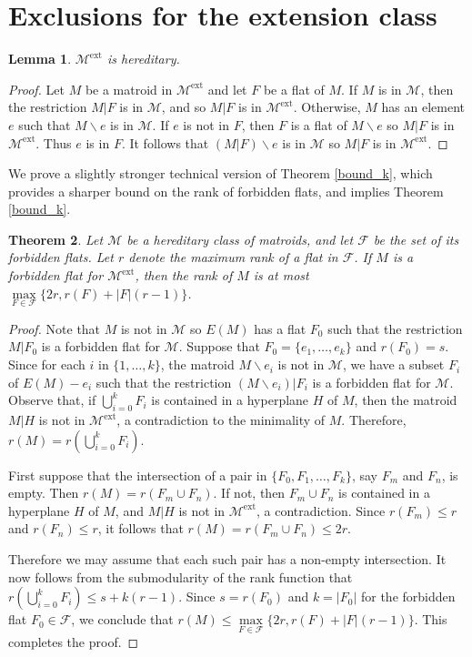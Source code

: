 \documentclass[11pt]{amsart}
\newtheorem{theorem}{Theorem}[section]
\newtheorem{lemma}[theorem]{Lemma}
\theoremstyle{definition}
\theoremstyle{remark}
\numberwithin{equation}{section}
\newcommand\Me{\mathcal{M}^\mathrm{ext}}
\newcommand\ba{\backslash}
\begin{document}
\section{Exclusions for the extension class}



\begin{lemma}
\label{hereditary}
$\Me$ is hereditary.
\end{lemma}
\begin{proof}
Let $M$ be a matroid in $\Me$ and let $F$ be a flat of $M$. If $M$ is in $\mathcal{M}$, then the restriction $M|F$ is in $\mathcal{M}$, and so $M|F$ is in $\Me$. Otherwise, $M$ has an element $e$ such that $M \ba e$ is in $\mathcal{M}$. If $e$ is not in $F$, then $F$ is a flat of $M \ba e$ so  $M|F$ is in $\Me$. Thus $e$ is in $F$.  It follows that $(M|F)\ba e$ is in $\mathcal{M}$ so $M|F$ is in $\Me$.
\end{proof}


We prove a slightly stronger technical version of Theorem \ref{bound_k}, which provides a sharper bound on the rank of forbidden flats, and implies Theorem \ref{bound_k}. 

\begin{theorem}
\label{bound_k_general}
Let $\mathcal{M}$ be a hereditary class of matroids, and let $\mathcal{F}$ be the set of its forbidden flats. Let $r$ denote the maximum rank of a flat in $\mathcal{F}$. If $M$ is a forbidden flat for $\Me$, then the rank of $M$ is at most $\max\limits_{F \in \mathcal{F}}{\{2r, r(F) + |F|(r-1)\}}$. 
\end{theorem}


\begin{proof}
Note that $M$ is not in $\mathcal{M}$ so $E(M)$ has a flat $F_0$ such that the restriction $M|F_0$ is a forbidden flat for $\mathcal{M}$. Suppose that $F_0 = \{e_1, \ldots, e_k\}$ and $r(F_0) = s$. Since for each $i$ in $\{1, \ldots, k\}$, the matroid $M \ba e_i$ is not in $\mathcal{M}$, we have a subset $F_i$ of $E(M)-e_i$ such that the restriction $(M \ba e_i)|F_i$ is a forbidden flat for $\mathcal{M}$. Observe that, if $\bigcup_{i=0}^{k} F_i$ is contained in a hyperplane $H$ of $M$, then the matroid $M|H$ is not in $\Me$, a contradiction to the minimality of $M$. Therefore, $r(M) = r(\bigcup_{i=0}^{k} F_i)$.

First suppose that the intersection of a pair in $\{F_0, F_1, \ldots, F_k\}$, say $F_m$ and $F_n$, is empty. Then $r(M)=r(F_m \cup F_n)$. If not, then $F_m \cup F_n$ is contained in a hyperplane $H$ of $M$, and $M|H$ is not in $\Me$, a contradiction. Since $r(F_m) \leq r$ and $r(F_n) \leq r$, it follows that $r(M) = r(F_m\cup F_n) \leq 2r$. 

Therefore we may assume that each such pair has a non-empty intersection. It now follows from the submodularity of the rank function that $r(\bigcup_{i=0}^{k} F_i) \leq s + k(r-1)$. Since $s = r(F_0)$ and $k = |F_0|$ for the forbidden flat $F_0 \in \mathcal{F}$, we conclude that $r(M) \leq \max\limits_{F \in \mathcal{F}} \{2r, r(F) + |F|(r-1)\}$. This completes the proof.
\end{proof}
\end{document}
